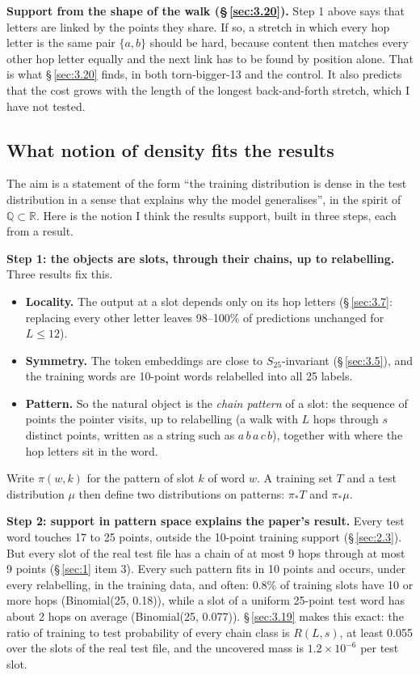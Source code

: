 \documentclass[paper=a4,fontsize=11pt,DIV=11,parskip=half,headings=small,numbers=noendperiod]{scrartcl}
\DeclareRobustCommand{\lead}[1]{\textsf{\bfseries\color{accent}#1}}
\DeclareRobustCommand{\code}[1]{{\fontseries{m}\ttfamily #1}}
\begin{document}
\lead{Support from the shape of the walk (\S\,\ref{sec:3.20}).} Step 1 above says that letters are linked by the
points they share. If so, a stretch in which every hop letter is the same pair $\{a,b\}$ should be hard, because
content then matches every other hop letter equally and the next link has to be found by position alone. That is
what \S\,\ref{sec:3.20} finds, in both \code{torn-\allowbreak{}bigger-\allowbreak{}13} and the control. It also
predicts that the cost grows with the length of the longest back-and-forth stretch, which I have not tested.

\subsection{What notion of density fits the results}\label{sec:4.2}
The aim is a statement of the form “the training distribution is dense in the test distribution in a sense that
explains why the model generalises”, in the spirit of $\mathbb{Q}\subset\mathbb{R}$. Here is the notion I think
the results support, built in three steps, each from a result.

\lead{Step 1: the objects are slots, through their chains, up to relabelling.} Three results fix this.

\begin{itemize}
\item \lead{Locality.} The output at a slot depends only on its hop letters (\S\,\ref{sec:3.7}: replacing every
  other letter leaves 98–100\% of predictions unchanged for $L\le12$).
\item \lead{Symmetry.} The token embeddings are close to $S_{25}$-invariant (\S\,\ref{sec:3.5}), and the
  training words are 10-point words relabelled into all 25 labels.
\item \lead{Pattern.} So the natural object is the \emph{chain pattern} of a slot: the sequence of points the
  pointer visits, up to relabelling (a walk with $L$ hops through $s$ distinct points, written as a string such
  as $a\,b\,a\,c\,b$), together with where the hop letters sit in the word.
\end{itemize}

Write $\pi(w,k)$ for the pattern of slot $k$ of word $w$. A training set $T$ and a test distribution $\mu$ then
define two distributions on patterns: $\pi_*T$ and $\pi_*\mu$.

\lead{Step 2: support in pattern space explains the paper’s result.} Every test word touches 17 to 25 points,
outside the 10-point training support (\S\,\ref{sec:2.3}). But every slot of the real test file has a chain of
at most 9 hops through at most 9 points (\S\,\ref{sec:1} item 3). Every such pattern fits in 10 points and
occurs, under every relabelling, in the training data, and often: 0.8\% of training slots have 10 or more hops
(Binomial(25, 0.18)), while a slot of a uniform 25-point test word has about 2 hops on average (Binomial(25,
0.077)). \S\,\ref{sec:3.19} makes this exact: the ratio of training to test probability of every chain class is
$R(L,s)$, at least 0.055 over the slots of the real test file, and the uncovered mass is $1.2\times10^{-6}$ per
test slot.
\end{document}
